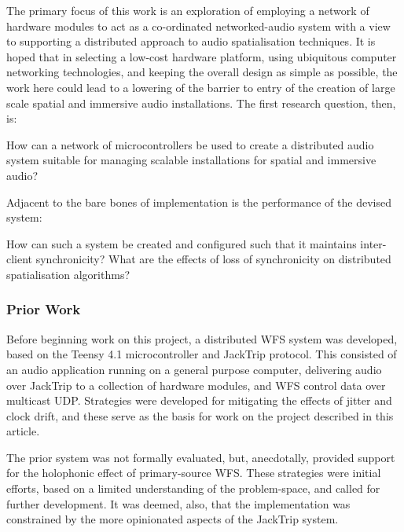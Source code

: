 The primary focus of this work is an exploration of employing a
network of hardware modules to act as a co-ordinated networked-audio system
with a view to supporting a distributed approach to audio spatialisation
techniques.
It is hoped that in selecting a low-cost hardware platform, using ubiquitous
computer networking technologies, and keeping the overall design as simple as
possible, the work here could lead to a lowering of the barrier to entry of
the creation of large scale spatial and immersive audio installations.
The first research question, then, is:

\begin{researchq}
    \label{rq:rq1}
    How can a network of microcontrollers be used to create a distributed audio
    system suitable for managing scalable installations for spatial and
    immersive audio?
\end{researchq}

\noindent
Adjacent to the bare bones of implementation is the performance of the devised
system:

\begin{researchq}
    \label{rq:rq2}
    How can such a system be created and configured such that it maintains
    inter-client synchronicity?
    What are the effects of loss of synchronicity on distributed spatialisation
    algorithms?
\end{researchq}


\subsubsection{Prior Work}

Before beginning work on this project, a distributed WFS system was
developed, based on the Teensy 4.1 microcontroller and JackTrip protocol.
This consisted of an audio application running on a general purpose computer,
delivering audio over JackTrip to a collection of hardware modules, and
WFS control data over multicast UDP.
Strategies were developed for mitigating the effects of jitter and clock drift,
and these serve as the basis for work on the project described in this article.

The prior system was not formally evaluated, but, anecdotally, provided
support for the holophonic effect of primary-source WFS.
These strategies were initial efforts, based on a limited understanding
of the problem-space, and called for further development.
It was deemed, also, that the implementation was constrained by the more
opinionated aspects of the JackTrip system.
